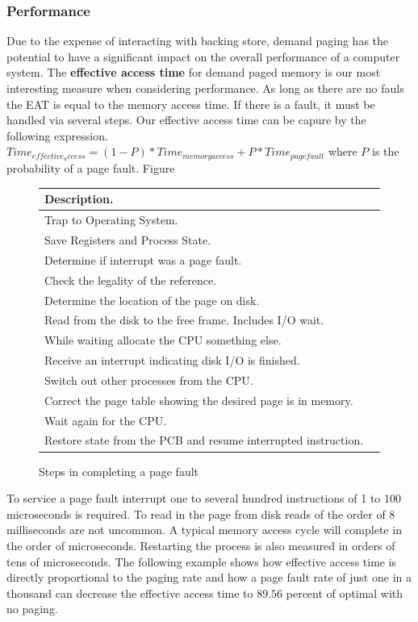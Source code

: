 \documentclass[10pt,a4paper]{article}
\begin{document}
\subsubsection{Performance}
Due to the expense of interacting with backing store, demand paging has the potential to have a significant impact on the overall performance of a computer system. The {\bf effective access time} for demand paged memory is our most interesting measure when considering performance. As long as there are no fauls the EAT is equal to the memory access time. If there is a fault, it must be handled via several steps. Our effective access time can be capure by the following expression.
$Time_{effective_access} = (1 - P) * Time_{memory access} + P * Time_{page fault}$ where $P$ is the probability of a page fault. 
\newline\newline
Figure \cite{pf-steps}
\begin{figure}
\caption{Steps in completing a page fault}
\begin{center}
\begin{tabular}{| l | l | }
  \hline
  Description. \\
  \hline
  Trap to Operating System. \\
  Save Registers and Process State. \\
  Determine if interrupt was a page fault. \\
  Check the legality of the reference. \\
  Determine the location of the page on disk. \\
  Read from the disk to the free frame. Includes I/O wait. \\
  While waiting allocate the CPU something else. \\
  Receive an interrupt indicating disk I/O is finished.  \\
  Switch out other processes from the CPU. \\
  Correct the page table showing the desired page is in memory. \\
  Wait again for the CPU. \\  
  Restore state from the PCB and resume interrupted instruction. \\
  \hline
\end{tabular}
\label{pf-steps}
\end{center}
\end{figure}
To service a page fault interrupt one to several hundred instructions of 1 to 100 microseconds is required. To read in the page from disk reads of the order of 8 milliseconds are not uncommon. A typical memory access cycle will complete in the order of microseconds. Restarting the process is also measured in orders of tens of microseconds. The following example shows how effective access time is directly proportional to the paging rate and how a page fault rate of just one in a thousand can decrease the effective access time to $89.56$ percent of optimal with no paging.  
\end{document}
